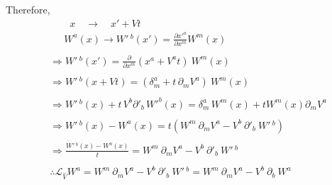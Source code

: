 \documentclass[14pt]{article} %
\begin{document}
Therefore,
\begin{align*}
& \quad \quad x \quad \rightarrow \quad x' + Vt \\
& \quad ~~W^a(x) \rightarrow W'\,^b(x') = \frac{\partial x'^a}{\partial x^m} W^m(x) \\\\
& \Rightarrow W'\,^b(x') = \frac{\partial}{\partial x^m}(x^a + V^a t)~W^m(x) \\\\
& \Rightarrow W'\,^b(x + Vt) = \left( \delta^a_m + t\,\partial_m V^a \right)~W^m(x) \\\\
& \Rightarrow W'\,^b(x)+ t\,V^b \partial'_b\,W'^b(x) = \delta^a_m\,W^m(x) + t W^m(x) \partial_m V^a \\\\
& \Rightarrow W'\,^b(x) - W^a(x) = t \left(W^m~\partial_m V^a - V^b~ \partial'_b ~W'\,^b \right) \\\\
& \Rightarrow \frac{W'\,^b(x) - W^a(x)}{t} = W^m~\partial_m V^a - V^b~ \partial'_b ~W'\,^b \\\\
&  \boxed{\therefore \mathscr{L}_{\hat{V}} W^a = W^m~\partial_m V^a - V^b~ \partial'_b ~W'\,^b = W^m~\partial_m V^a - V^b~ \partial_b ~W^a}
\end{align*}
\end{document}
